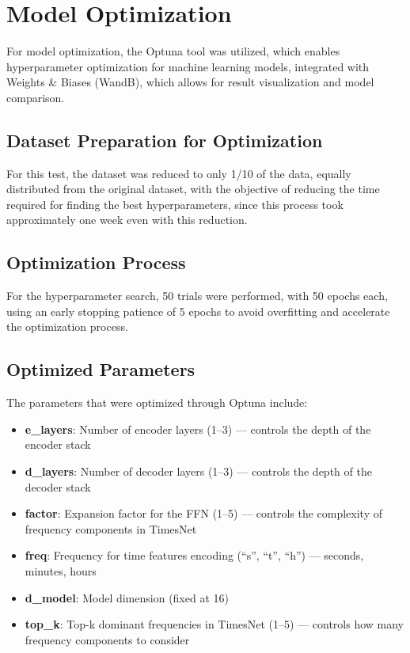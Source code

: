 \section{Model Optimization}

For model optimization, the Optuna tool was utilized, which enables hyperparameter optimization for machine learning models, integrated with Weights \& Biases (WandB), which allows for result visualization and model comparison.

\subsection{Dataset Preparation for Optimization}

For this test, the dataset was reduced to only 1/10 of the data, equally distributed from the original dataset, with the objective of reducing the time required for finding the best hyperparameters, since this process took approximately one week even with this reduction.

\subsection{Optimization Process}

For the hyperparameter search, 50 trials were performed, with 50 epochs each, using an early stopping patience of 5 epochs to avoid overfitting and accelerate the optimization process.

\subsection{Optimized Parameters}

The parameters that were optimized through Optuna include:

\begin{itemize}
    \item \textbf{e\_layers}: Number of encoder layers (1--3) --- controls the depth of the encoder stack
    \item \textbf{d\_layers}: Number of decoder layers (1--3) --- controls the depth of the decoder stack  
    \item \textbf{factor}: Expansion factor for the FFN (1--5) --- controls the complexity of frequency components in TimesNet
    \item \textbf{freq}: Frequency for time features encoding (``s'', ``t'', ``h'') --- seconds, minutes, hours
    \item \textbf{d\_model}: Model dimension (fixed at 16)
    \item \textbf{top\_k}: Top-k dominant frequencies in TimesNet (1--5) --- controls how many frequency components to consider
\end{itemize}

